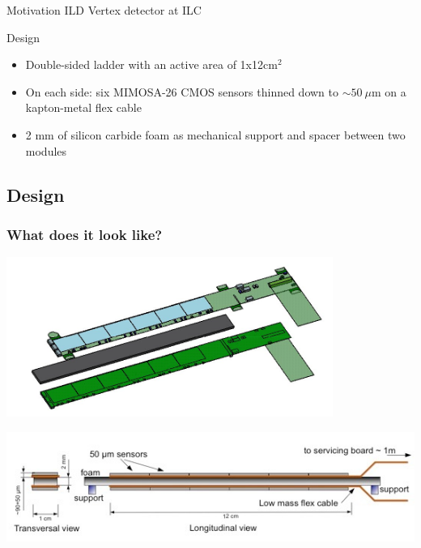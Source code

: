 \documentclass{beamer}
\begin{document}
\begin{frame}
  \begin{block}{Motivation}
    ILD Vertex detector at ILC
  \end{block}

  \vspace{-0.18cm}
  \begin{block}{Design}
    \begin{itemize}
      \item Double-sided ladder with an active area of 1x12cm$^2$
      \item On each side: six MIMOSA-26 CMOS sensors thinned down to $\sim 50~\mu$m on a kapton-metal flex cable
      \item 2 mm of silicon carbide foam as mechanical support and spacer between two modules
    \end{itemize}
  \end{block}
\end{frame}

\subsection{Design}

\begin{frame}
  \frametitle{What does it look like?}

  \vspace{-0.2cm}
  \begin{center}
    \includegraphics[width = 0.8\textwidth]{Pictures/Plume2_vue_eclatee.jpg}

  \end{center}

  \vspace{-0.2cm}
  \begin{center}
    \includegraphics[width = 10 cm]{Pictures/scheme_plume.png}

  \end{center}
\end{frame}
\end{document}

